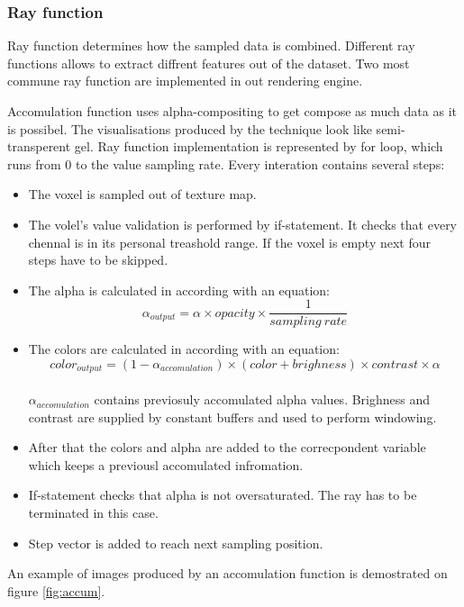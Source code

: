 \documentclass[twoside, english, 11pt]{report}
\begin{document}
\subsubsection{Ray function}

Ray function determines how the sampled data is combined. Different ray functions allows to extract diffrent features out of the dataset. Two most commune ray function are implemented in out rendering engine.

Accomulation function uses alpha-compositing to get compose as much data as it is possibel. The visualisations produced by the technique look like semi-transperent gel. Ray function implementation is represented by for loop, which runs from 0 to the value sampling rate. Every interation contains several steps:
\begin{itemize}
\item The voxel is sampled out of texture map.
\item The volel's value validation is performed by if-statement. It checks that every chennal is in its personal treashold range. If the voxel is empty next four steps have to be skipped.
\item The alpha is calculated in according with an equation:
\begin{equation} \label{eq:alpha}
\alpha_{output} = \alpha \times opacity \times \frac {1}{{sampling\ rate}}
\end{equation}

\item The colors are calculated in according with an equation:
\begin{equation} \label{eq:color}
color_{output} = (1 - \alpha_{accomulation}) \times (color + brighness) \times contrast  \times \alpha
\end{equation}\\

$\alpha_{accomulation}$ contains previosuly accomulated alpha values. Brighness and contrast are supplied by constant buffers and used to perform windowing.
\item After that the colors and alpha are added to the correcpondent variable which keeps a previousl accomulated infromation.
\item If-statement checks that alpha is not oversaturated. The ray has to be terminated in this case.
\item Step vector is added to reach next sampling position.
\end{itemize}

An example of images produced by an accomulation function is demostrated on figure \ref{fig:accum}.\\
\end{document}
